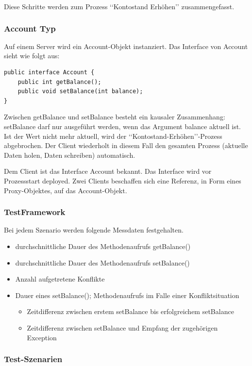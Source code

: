 \documentclass{article}
\begin{document}
\noindent Diese Schritte werden zum Prozess ‘‘Kontostand Erhöhen’’ zusammengefasst.

\subsubsection{Account Typ}
\label{sec:account-typ}

Auf einem Server wird ein Account-Objekt instanziert.
Das Interface von Account sieht wie folgt aus:
\begin{lstlisting}
public interface Account {
    public int getBalance();
    public void setBalance(int balance);    
}
\end{lstlisting}
Zwischen getBalance und setBalance besteht ein kausaler Zusammenhang: setBalance darf nur ausgeführt werden, wenn das Argument balance aktuell ist. Ist der Wert nicht mehr aktuell, wird der ‘‘Kontostand-Erhöhen’’-Prozess abgebrochen. Der Client wiederholt in diesem Fall den gesamten Prozess (aktuelle Daten holen, Daten schreiben) automatisch.

Dem Client ist das Interface Account bekannt. Das Interface wird vor Prozessstart deployed.
Zwei Clients beschaffen sich eine Referenz, in Form eines Proxy-Objektes, auf das Account-Objekt. 

\subsubsection{TestFramework}
\label{sec:testframework-1}


Bei jedem Szenario werden folgende Messdaten festgehalten.
\begin{itemize}
\item durchschnittliche Dauer des Methodenaufrufs getBalance()
\item durchschnittliche Dauer des Methodenaufrufs setBalance()
\item Anzahl aufgetretene Konflikte
\item Dauer eines setBalance(); Methodenaufrufs im Falle einer Konfliktsituation
  \begin{itemize}
  \item Zeitdifferenz zwischen erstem setBalance bis erfolgreichem setBalance
  \item Zeitdifferenz zwischen setBalance und Empfang der zugehörigen Exception
  \end{itemize}
\end{itemize}

\subsubsection{Test-Szenarien}
\label{sec:test-szenarien}
\end{document}
